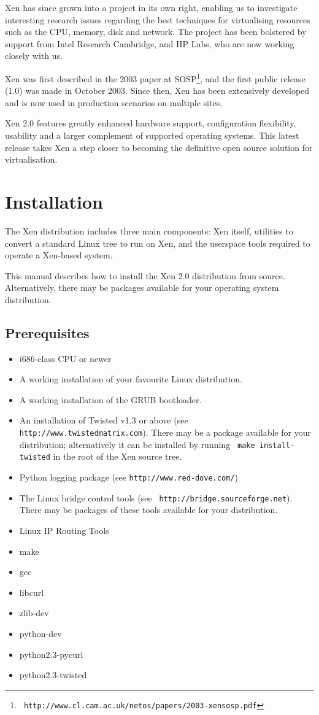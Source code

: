 \documentclass[11pt,twoside,final,openright]{xenstyle}
\begin{document}
Xen has since grown into a project in its own right, enabling us to
investigate interesting research issues regarding the best techniques
for virtualising resources such as the CPU, memory, disk and network.
The project has been bolstered by support from Intel Research
Cambridge, and HP Labs, who are now working closely with us.

Xen was first described in the 2003 paper at SOSP\footnote{\tt
http://www.cl.cam.ac.uk/netos/papers/2003-xensosp.pdf}, and the
first public release (1.0) was made in October 2003.  Since
then, Xen has been extensively developed and is now used in production
scenarios on multiple sites.

Xen 2.0 features greatly enhanced hardware support, configuration
flexibility, usability and a larger complement of supported operating
systems. This latest release takes Xen a step closer to becoming the 
definitive open source solution for virtualisation.

\chapter{Installation}

The Xen distribution includes three main components:  Xen itself,
utilities to convert a standard Linux tree to run on Xen, and the
userspace tools required to operate a Xen-based system.

This manual describes how to install the Xen 2.0 distribution from
source.  Alternatively, there may be packages available for your
operating system distribution.

\section{Prerequisites}
\label{sec:prerequisites}
\begin{itemize}
\item i686-class CPU or newer
\item A working installation of your favourite Linux distribution.
\item A working installation of the GRUB bootloader.
\item An installation of Twisted v1.3 or above (see {\tt
http://www.twistedmatrix.com}).  There may be a package available for
your distribution; alternatively it can be installed by running {\tt
make install-twisted} in the root of the Xen source tree.
\item Python logging package (see {\tt http://www.red-dove.com/})
\item The Linux bridge control tools (see {\tt
http://bridge.sourceforge.net}).  There may be packages of these tools
available for your distribution.
\item Linux IP Routing Tools
\item make
\item gcc
\item libcurl
\item zlib-dev
\item python-dev
\item python2.3-pycurl
\item python2.3-twisted
\end{itemize}
\end{document}
